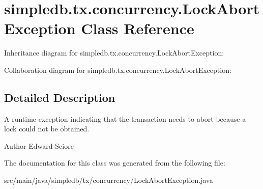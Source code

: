 \hypertarget{classsimpledb_1_1tx_1_1concurrency_1_1LockAbortException}{}\section{simpledb.\+tx.\+concurrency.\+Lock\+Abort\+Exception Class Reference}
\label{classsimpledb_1_1tx_1_1concurrency_1_1LockAbortException}


Inheritance diagram for simpledb.\+tx.\+concurrency.\+Lock\+Abort\+Exception\+:


Collaboration diagram for simpledb.\+tx.\+concurrency.\+Lock\+Abort\+Exception\+:


\subsection{Detailed Description}
A runtime exception indicating that the transaction needs to abort because a lock could not be obtained. \begin{DoxyAuthor}{Author}
Edward Sciore 
\end{DoxyAuthor}


The documentation for this class was generated from the following file\+:\begin{DoxyCompactItemize}
\item 
src/main/java/simpledb/tx/concurrency/Lock\+Abort\+Exception.\+java\end{DoxyCompactItemize}
